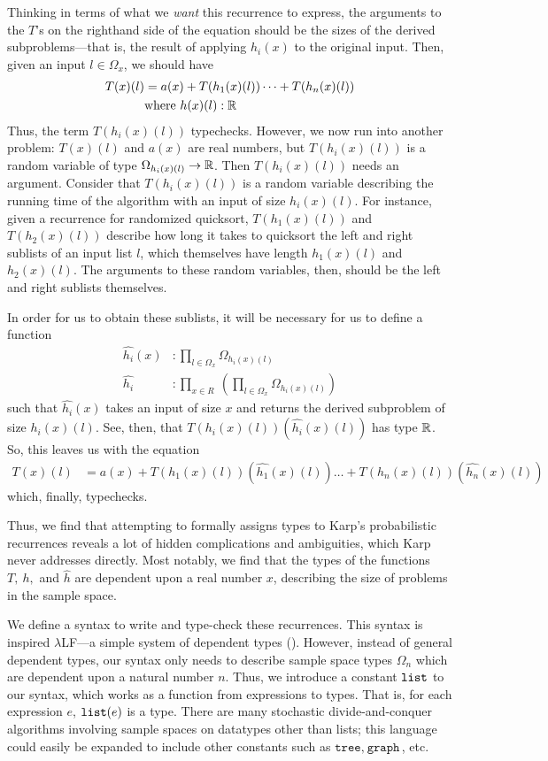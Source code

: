 Thinking in terms of what we \emph{want} this recurrence to express, the arguments to the $T$'s on the righthand side of
the equation should be the sizes of the derived subproblems---that is, the result of applying $h_i(x)$ to the original input.
Then, given an input $l \in \Omega_x$, we should have
\begin{align*}
T(x)(l) &= a(x) + T(h_1(x)(l)) \dots + T(h_n(x)(l)) \\
&\text{where } h(x)(l) : \mathbb{R} 
\end{align*}
 Thus, the term $T(h_i(x)(l))$ typechecks. However, we now run into another problem: $T(x)(l)$ and $a(x)$ are real numbers,
but $T(h_i(x)(l))$ is a random variable of type $\Omega_{h_i(x)(l)} \rightarrow \mathbb{R}$. Then $T(h_i(x)(l))$ needs an argument.
Consider that $T(h_i(x)(l))$ is a random variable describing the running time of the algorithm with an input of size 
$h_i(x)(l)$. For instance, given a recurrence for randomized quicksort, $T(h_1(x)(l))$ and $T(h_2(x)(l))$ describe how long it 
takes to quicksort the left and right sublists of an input list $l$, which themselves have length $h_1(x)(l)$ and
$h_2(x)(l)$. The arguments to these random variables, then, should be the left and right sublists themselves. 

 In order for us to obtain these sublists, it will be necessary for us to define a function 
 \begin{align*}
 \hat{h_i}(x) &: \prod_{l \in \Omega_x} \Omega_{h_i(x)(l)} \\
 \hat{h_i} &: \prod_{x \in R} \ ( \prod_{l \in \Omega_x} \Omega_{h_i(x)(l)})
 \end{align*}
 such that $\hat{h_i}(x)$ takes an input of size $x$ and returns the derived subproblem of size $h_i(x)(l)$. See, then, that
 $T(h_i(x)(l))(\hat{h_i}(x)(l))$ has type $\mathbb{R}$. So, this leaves us with the equation
 \begin{align*}
 T(x)(l) &= a(x) + T(h_1(x)(l))(\hat{h_1}(x)(l)) \dots + T(h_n(x)(l))(\hat{h_n}(x)(l))
 \end{align*}
 which, finally, typechecks.
 
 Thus, we find that attempting to formally assigns types to Karp's probabilistic recurrences reveals a lot of hidden 
 complications and ambiguities, which Karp never addresses directly. Most notably, we find that the types of the 
 functions $T, \ h,$ and $\hat{h}$ are dependent upon a real number $x$, describing the size of problems in the sample space.
 
We define a syntax to write and type-check these recurrences. This syntax is inspired $\lambda$LF---a simple system of 
dependent types (\cite{Pierce:2005aa}). However, instead of general dependent types, our syntax only needs to
describe sample space types $\Omega_n$ which are dependent upon a natural number $n$. Thus, we introduce
a constant $\texttt{list}$ to our syntax, which works as a function from expressions to types. That is, for each 
expression $e$, $\texttt{list}(e)$ is a type. There are many stochastic divide-and-conquer algorithms involving sample spaces
on datatypes other than lists; this language could easily be expanded to include other constants such as
 $\texttt{tree}, \ \texttt{graph}$, etc.
 
